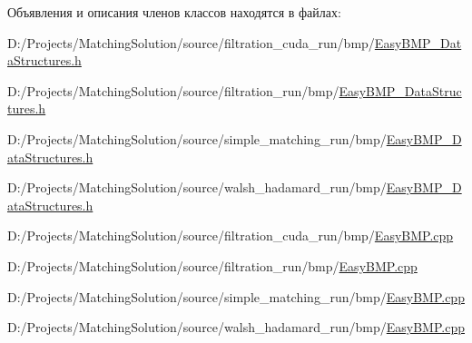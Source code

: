Объявления и описания членов классов находятся в файлах:\begin{CompactItemize}
\item 
D:/Projects/MatchingSolution/source/filtration\_\-cuda\_\-run/bmp/\hyperlink{filtration__cuda__run_2bmp_2_easy_b_m_p___data_structures_8h}{EasyBMP\_\-DataStructures.h}\item 
D:/Projects/MatchingSolution/source/filtration\_\-run/bmp/\hyperlink{filtration__run_2bmp_2_easy_b_m_p___data_structures_8h}{EasyBMP\_\-DataStructures.h}\item 
D:/Projects/MatchingSolution/source/simple\_\-matching\_\-run/bmp/\hyperlink{simple__matching__run_2bmp_2_easy_b_m_p___data_structures_8h}{EasyBMP\_\-DataStructures.h}\item 
D:/Projects/MatchingSolution/source/walsh\_\-hadamard\_\-run/bmp/\hyperlink{walsh__hadamard__run_2bmp_2_easy_b_m_p___data_structures_8h}{EasyBMP\_\-DataStructures.h}\item 
D:/Projects/MatchingSolution/source/filtration\_\-cuda\_\-run/bmp/\hyperlink{filtration__cuda__run_2bmp_2_easy_b_m_p_8cpp}{EasyBMP.cpp}\item 
D:/Projects/MatchingSolution/source/filtration\_\-run/bmp/\hyperlink{filtration__run_2bmp_2_easy_b_m_p_8cpp}{EasyBMP.cpp}\item 
D:/Projects/MatchingSolution/source/simple\_\-matching\_\-run/bmp/\hyperlink{simple__matching__run_2bmp_2_easy_b_m_p_8cpp}{EasyBMP.cpp}\item 
D:/Projects/MatchingSolution/source/walsh\_\-hadamard\_\-run/bmp/\hyperlink{walsh__hadamard__run_2bmp_2_easy_b_m_p_8cpp}{EasyBMP.cpp}\end{CompactItemize}
